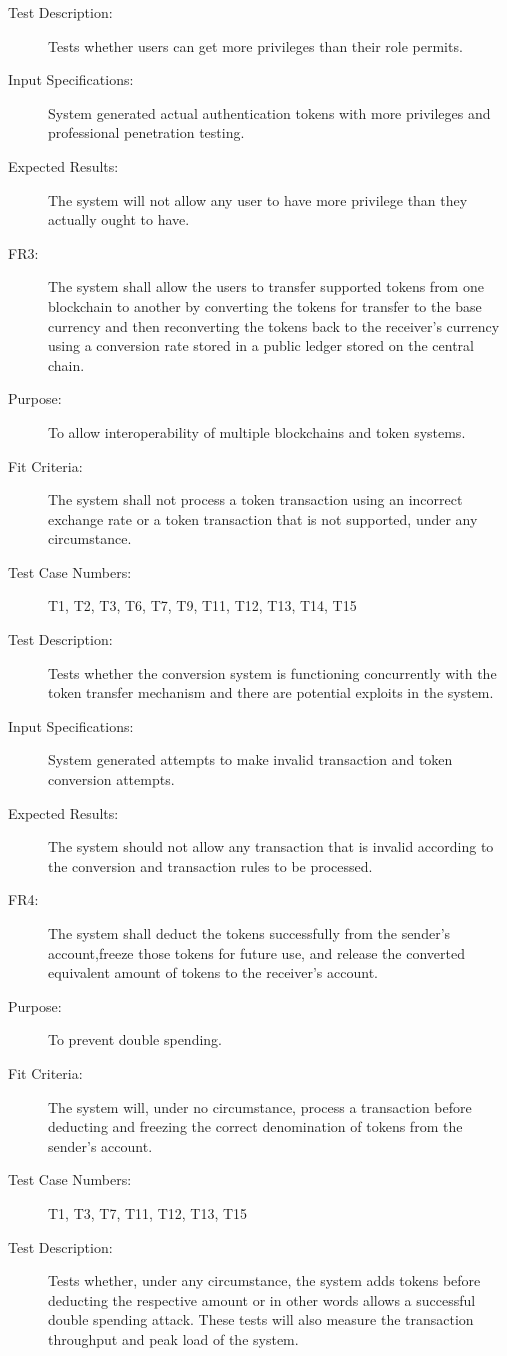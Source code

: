 \documentclass[a4paper,twoside,phd]{BYUPhys}
\begin{document}
\begin{description}
\item[Test Description:] Tests whether users can get more privileges than their role permits.
\item[Input Specifications:] System generated actual authentication tokens with more privileges and professional penetration testing.
\item[Expected Results:] The system will not allow any user to have more privilege than they actually ought to have.
\\
\item[FR3:] The system shall allow the users to transfer supported tokens from one blockchain to another by converting the tokens for transfer to the base currency and then reconverting  the  tokens  back  to  the  receiver’s  currency  using  a  conversion  rate stored in a public ledger stored on the central chain.
\item[Purpose:] To allow interoperability of multiple blockchains and token systems.
\item[Fit Criteria:] The system shall not process a token transaction using an incorrect exchange rate or a token transaction that is not supported, under any circumstance.
\item[Test Case Numbers:] T1, T2, T3, T6, T7, T9, T11, T12, T13, T14, T15
\item[Test Description:] Tests whether the conversion system is functioning concurrently with the token transfer mechanism and there are potential exploits in the system.
\item[Input Specifications:] System generated attempts to make invalid transaction and token conversion attempts.
\item[Expected Results:] The system should not allow any transaction that is invalid according to the conversion and transaction rules to be processed.
\\
\item[FR4:] The system shall deduct the tokens successfully from the sender’s account,freeze those tokens for future use, and release the converted equivalent amount of tokens to the receiver’s account.
\item[Purpose:] To prevent double spending.
\item[Fit Criteria:] The system will, under no circumstance, process a transaction before deducting and freezing the correct denomination of tokens from the sender's account.
\item[Test Case Numbers:] T1, T3, T7, T11, T12, T13, T15
\item[Test Description:] Tests whether, under any circumstance, the system adds tokens before deducting the respective amount or in other words allows a successful double spending attack. These tests will also measure the transaction throughput and peak load of the system.

\end{description}
\end{document}

